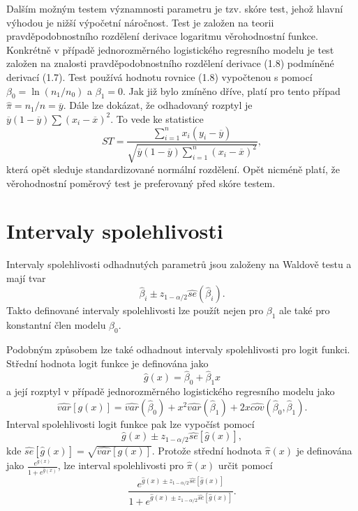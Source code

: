 Dalším možným testem významnosti parametru je tzv. skóre test, jehož hlavní výhodou je nižší výpočetní náročnost. Test je založen na teorii pravděpodobnostního rozdělení derivace logaritmu věrohodnostní funkce. Konkrétně v případě jednorozměrného logistického regresního modelu je test založen na znalosti pravděpodobnostního rozdělení derivace (1.8) podmíněné derivací (1.7). Test používá hodnotu rovnice (1.8) vypočtenou s pomocí $\beta_0 = \ln(n_1 / n_0)$ a $\beta_1 = 0$. Jak již bylo zmíněno dříve, platí pro tento případ $\hat{\pi} = n_1 / n = \overline{y}$. Dále lze dokázat, že odhadovaný rozptyl je $\overline{y}(1 - \overline{y}) \sum (x_i - \overline{x})^2$. To vede ke statistice
\begin{equation}
ST = \frac{\sum_{i = 1}^n x_i (y_i - \overline{y})}{\sqrt{\overline{y}(1 - \overline{y}) \sum_{i = 1}^n (x_i - \overline{x})^2}},
\end{equation}
která opět sleduje standardizované normální rozdělení. Opět nicméně platí, že věrohodnostní poměrový test je preferovaný před skóre testem.

\section{Intervaly spolehlivosti}

Intervaly spolehlivosti odhadnutých parametrů jsou založeny na Waldově testu a mají tvar
\begin{equation}
\hat{\beta}_i \pm z_{1 - \alpha / 2} \widehat{se}(\hat{\beta}_i).
\end{equation}
Takto definované intervaly spolehlivosti lze použít nejen pro $\beta_1$ ale také pro konstantní člen modelu $\beta_0$.

Podobným způsobem lze také odhadnout intervaly spolehlivosti pro logit funkci. Střední hodnota logit funkce je definována jako
\begin{equation}
\hat{g}(x) = \hat{\beta}_0 + \hat{\beta}_1 x
\end{equation}
a její rozptyl v případě jednorozměrného logistického regresního modelu jako
\begin{equation}
\widehat{var}[g(x)] = \widehat{var}(\hat{\beta}_0) + x^2 \widehat{var}(\hat{\beta}_1) + 2 x \widehat{cov}(\hat{\beta}_0, \hat{\beta}_1).
\end{equation}
Interval spolehlivosti logit funkce pak lze vypočíst pomocí
\begin{equation}
\hat{g}(x) \pm z_{1 - \alpha / 2}\widehat{se}[\hat{g}(x)],
\end{equation}
kde $\widehat{se}[\hat{g}(x)] = \sqrt{\widehat{var}[g(x)]}$. Protože střední hodnota $\hat{\pi}(x)$ je definována jako $\frac{e^{\hat{g}(x)}}{1 + e^{\hat{g}(x)}}$, lze interval spolehlivosti pro $\hat{\pi}(x)$ určit pomocí
\begin{equation}
\frac{e^{\hat{g}(x) \pm z_{1 - \alpha / 2} \widehat{se}[\hat{g}(x)]}}{1 + e^{\hat{g}(x) \pm z_{1 - \alpha / 2} \widehat{se}[\hat{g}(x)]}}.
\end{equation}
